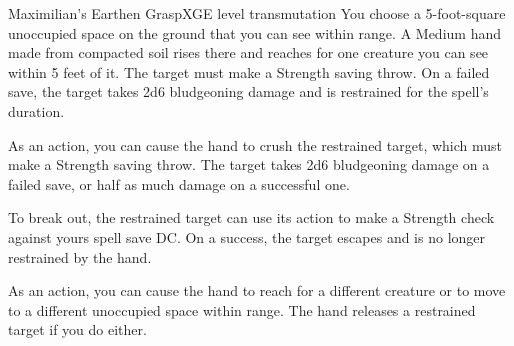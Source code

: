 \begin{spell}{Maximilian's Earthen Grasp}{XGE}{ level transmutation}
{
}
You choose a 5-foot-square unoccupied space on the
ground that you can see within range. A Medium hand
made from compacted soil rises there and reaches for
one creature you can see within 5 feet of it. The target
must make a Strength saving throw. On a failed save,
the target takes 2d6 bludgeoning damage and is restrained
for the spell's duration.

As an action, you can cause the hand to crush the
restrained target, which must make a Strength saving
throw. The target takes 2d6 bludgeoning damage on a
failed save, or half as much damage on a successful one.

To break out, the restrained target can use its action
to make a Strength check against yours spell save DC.
On a success, the target escapes and is no longer restrained
by the hand.

As an action, you can cause the hand to reach for a
different creature or to move to a different unoccupied
space within range. The hand releases a restrained target
if you do either.
\end{spell}